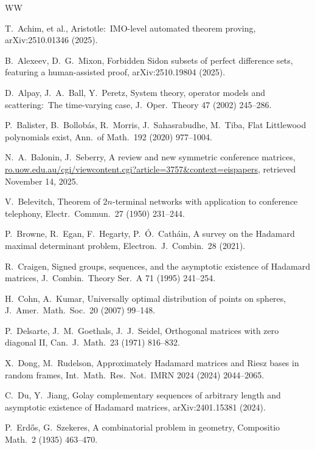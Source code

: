 \documentclass[11pt]{article}
\theoremstyle{plain}
\theoremstyle{definition}
\begin{document}
\begin{thebibliography}{WW}

T.\ Achim, et al.,
Aristotle:\ IMO-level automated theorem proving,
arXiv:2510.01346 (2025).

B.\ Alexeev, D.\ G.\ Mixon,
Forbidden Sidon subsets of perfect difference sets, featuring a human-assisted proof,
arXiv:2510.19804 (2025).

D.\ Alpay, J.\ A.\ Ball, Y.\ Peretz, 
System theory, operator models and scattering:\ The time-varying case,
J.\ Oper.\ Theory 47 (2002) 245--286.

P.\ Balister, B.\ Bollob\'as, R.\ Morris, J.\ Sahasrabudhe, M.\ Tiba,
Flat Littlewood polynomials exist,
Ann.\ of Math.\ 192 (2020) 977--1004.

N.\ A.\ Balonin, J.\ Seberry,
A review and new symmetric conference matrices, 
\url{ro.uow.edu.au/cgi/viewcontent.cgi?article=3757&context=eispapers},
retrieved November 14, 2025.

V.\ Belevitch,
Theorem of $2n$-terminal networks with application to conference telephony, 
Electr.\ Commun.\ 27 (1950) 231--244.

P.\ Browne, R.\ Egan, F.\ Hegarty, P.\ \'{O}.\ Cath\'{a}in,
A survey on the Hadamard maximal determinant problem, 
Electron.\ J.\ Combin.\ 28 (2021).

R.\ Craigen,
Signed groups, sequences, and the asymptotic existence of Hadamard matrices,
J.\ Combin.\ Theory Ser.\ A 71 (1995) 241--254.

H.\ Cohn, A.\ Kumar,
Universally optimal distribution of points on spheres,
J.\ Amer.\ Math.\ Soc.\ 20 (2007) 99--148.

P.\ Delsarte, J.\ M.\ Goethals, J.\ J.\ Seidel, 
Orthogonal matrices with zero diagonal II,
Can.\ J.\ Math.\ 23 (1971) 816--832.

X.\ Dong, M.\ Rudelson,
Approximately Hadamard matrices and Riesz bases in random frames,
Int.\ Math.\ Res.\ Not.\ IMRN 2024 (2024) 2044--2065.

C.\ Du, Y.\ Jiang,
Golay complementary sequences of arbitrary length and asymptotic existence of Hadamard matrices,
arXiv:2401.15381 (2024).

P.\ Erd\H{o}s, G.\ Szekeres,
A combinatorial problem in geometry,
Compositio Math.\ 2 (1935) 463--470.


\end{thebibliography}
\end{document}
